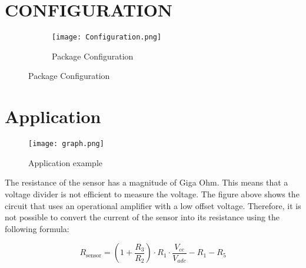 \documentclass[10pt]{datasheet}
\begin{document}
\vspace{1cm}




\clearpage
\onecolumn

\section*{CONFIGURATION}

\begin{figure}[h!]
    \centering
    \begin{subfigure}[b]{1\textwidth}  %
        \centering
        \texttt{[image: Configuration.png]}  %
        \caption{\centering Package Configuration}  %
        \label{fig:config1}
    \end{subfigure}
\end{figure}


\section*{Application}

\begin{figure}[h!]
\centering
\texttt{[image: graph.png]}
\caption{\centering Application example}
\label{fig:enter-label}
\end{figure}

The resistance of the sensor has a magnitude of Giga Ohm. This means that a voltage divider is not efficient to measure the voltage. The figure above shows the circuit that uses an operational amplifier with a low offset voltage. Therefore, it is not possible to convert the current of the sensor into its resistance using the following formula:

\[
R_{\text{sensor}} = \left(1 + \frac{R_3}{R_2}\right) \cdot R_1 \cdot \frac{V_{cc}}{V_{adc}} - R_1 - R_5
\]
\end{document}
